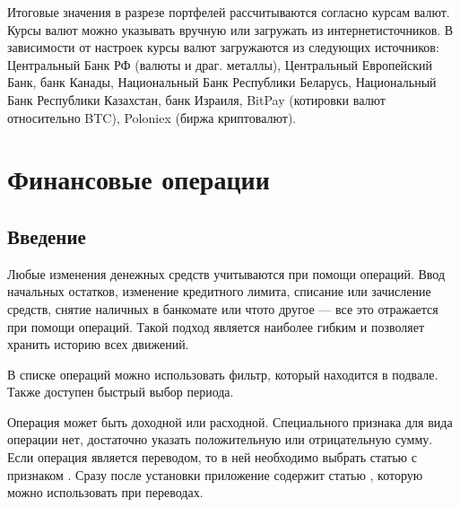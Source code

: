 \documentclass[a4paper,10pt,russian]{sphinxmanual}
\begin{document}
\sphinxAtStartPar
Итоговые значения в разрезе портфелей рассчитываются согласно курсам валют. Курсы валют можно указывать вручную или
загружать из интернет\sphinxhyphen{}источников. В зависимости от настроек курсы валют загружаются из следующих источников:
Центральный Банк РФ (валюты и драг. металлы), Центральный Европейский Банк, банк Канады, Национальный Банк Республики Беларусь,
Национальный Банк Республики Казахстан, банк Израиля, BitPay (котировки валют относительно BTC), Poloniex (биржа крипто\sphinxhyphen{}валют).

\sphinxstepscope


\chapter{Финансовые операции}
\label{\detokenize{transactions:chapter-transactions}}\label{\detokenize{transactions:id1}}\label{\detokenize{transactions::doc}}

\section{Введение}
\label{\detokenize{transactions:id2}}
\sphinxAtStartPar
Любые изменения денежных средств учитываются при помощи операций. Ввод начальных остатков,
изменение кредитного лимита, списание или зачисление средств, снятие наличных в банкомате или
что\sphinxhyphen{}то другое — все это отражается при помощи операций. Такой
подход является наиболее гибким и позволяет хранить историю всех движений.

\noindent{}
\noindent{}
\noindent{}

\sphinxAtStartPar
В списке операций можно использовать фильтр, который находится в подвале. Также доступен быстрый выбор периода.

\noindent{}
\noindent{}
\noindent{}

\sphinxAtStartPar
Операция может быть доходной или расходной. Специального признака для вида операции нет, достаточно указать
положительную или отрицательную сумму. Если операция является переводом, то в ней необходимо выбрать статью
с признаком . Сразу после установки приложение содержит статью ,
которую можно использовать при переводах.
\end{document}
